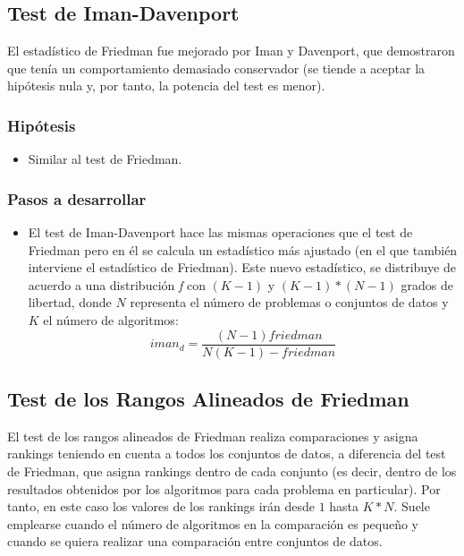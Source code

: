 
\subsection{Test de Iman-Davenport}
El estadístico de Friedman fue mejorado por Iman y Davenport, que demostraron que tenía un comportamiento
demasiado conservador (se tiende a aceptar la hipótesis nula y, por tanto, la potencia del test es menor).

\subsubsection{Hipótesis}
\begin{itemize}
\item Similar al test de Friedman.
\end{itemize}

\subsubsection{Pasos a desarrollar}
\begin{itemize}
\item El test de Iman-Davenport hace las mismas operaciones que el test de Friedman pero en él se calcula
un estadístico más ajustado (en el que también interviene el estadístico de Friedman). Este nuevo estadístico,
se distribuye de acuerdo a una distribución \textit{f} con $(K-1)$ y $(K-1)*(N-1)$ grados de libertad, donde $N$
representa el número de problemas o conjuntos de datos y $K$ el número de algoritmos:
\[ iman_d = \frac{(N-1)friedman}{N(K-1)-friedman} \]
\end{itemize}


\subsection{Test de los Rangos Alineados de Friedman}
El test de los rangos alineados de Friedman realiza comparaciones y asigna rankings teniendo en cuenta a
todos los conjuntos de datos, a diferencia del test de Friedman, que asigna rankings dentro de cada conjunto
(es decir, dentro de los resultados obtenidos por los algoritmos para cada problema en particular). Por tanto,
en este caso los valores de los rankings irán desde $1$ hasta $K*N$. Suele emplearse cuando el número de
algoritmos en la comparación es pequeño y cuando se quiera realizar una comparación entre conjuntos de datos.

